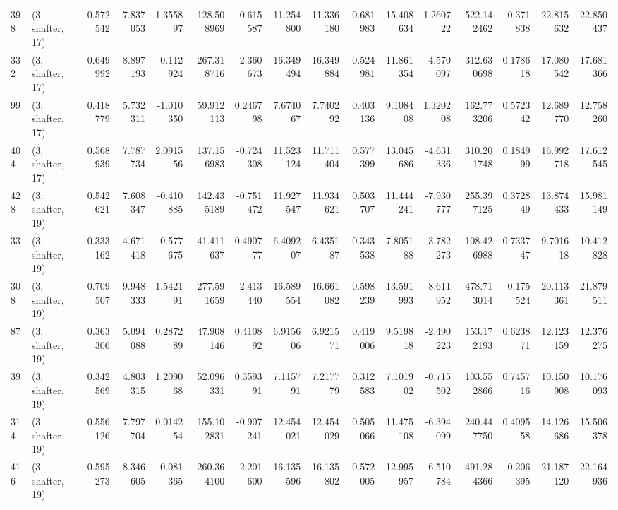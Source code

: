 \begin{tabular}{llrrrrrrrrrrrrrr}
398 &  (3, shafter, 17) &   0.572542 &   7.837053 &   1.355897 &   128.508969 &  -0.615587 &  11.254800 &  11.336180 &  0.681983 &  15.408634 &   1.260722 &   522.142462 &  -0.371838 &  22.815632 &  22.850437 \\
332 &  (3, shafter, 17) &   0.649992 &   8.897193 &  -0.112924 &   267.318716 &  -2.360673 &  16.349494 &  16.349884 &  0.524981 &  11.861354 &  -4.570097 &   312.630698 &   0.178618 &  17.080542 &  17.681366 \\
99  &  (3, shafter, 17) &   0.418779 &   5.732311 &  -1.010350 &    59.912113 &   0.246798 &   7.674067 &   7.740292 &  0.403136 &   9.108408 &   1.320208 &   162.773206 &   0.572342 &  12.689770 &  12.758260 \\
404 &  (3, shafter, 17) &   0.568939 &   7.787734 &   2.091556 &   137.156983 &  -0.724308 &  11.523124 &  11.711404 &  0.577399 &  13.045686 &  -4.631336 &   310.201748 &   0.184999 &  16.992718 &  17.612545 \\
428 &  (3, shafter, 19) &   0.542621 &   7.608347 &  -0.410885 &   142.435189 &  -0.751472 &  11.927547 &  11.934621 &  0.503707 &  11.444241 &  -7.930777 &   255.397125 &   0.372849 &  13.874433 &  15.981149 \\
33  &  (3, shafter, 19) &   0.333162 &   4.671418 &  -0.577675 &    41.411637 &   0.490777 &   6.409207 &   6.435187 &  0.343538 &   7.805188 &  -3.782273 &   108.426988 &   0.733747 &   9.701618 &  10.412828 \\
308 &  (3, shafter, 19) &   0.709507 &   9.948333 &   1.542191 &   277.591659 &  -2.413440 &  16.589554 &  16.661082 &  0.598239 &  13.591993 &  -8.611952 &   478.713014 &  -0.175524 &  20.113361 &  21.879511 \\
87  &  (3, shafter, 19) &   0.363306 &   5.094088 &   0.287289 &    47.908146 &   0.410892 &   6.915606 &   6.921571 &  0.419006 &   9.519818 &  -2.490223 &   153.172193 &   0.623871 &  12.123159 &  12.376275 \\
39  &  (3, shafter, 19) &   0.342569 &   4.803315 &   1.209068 &    52.096331 &   0.359391 &   7.115791 &   7.217779 &  0.312583 &   7.101902 &  -0.715502 &   103.552866 &   0.745716 &  10.150908 &  10.176093 \\
314 &  (3, shafter, 19) &   0.556126 &   7.797704 &   0.014254 &   155.102831 &  -0.907241 &  12.454021 &  12.454029 &  0.505066 &  11.475108 &  -6.394099 &   240.447750 &   0.409558 &  14.126686 &  15.506378 \\
416 &  (3, shafter, 19) &   0.595273 &   8.346605 &  -0.081365 &   260.364100 &  -2.201600 &  16.135596 &  16.135802 &  0.572005 &  12.995957 &  -6.510784 &   491.284366 &  -0.206395 &  21.187120 &  22.164936 \\

\end{tabular}
